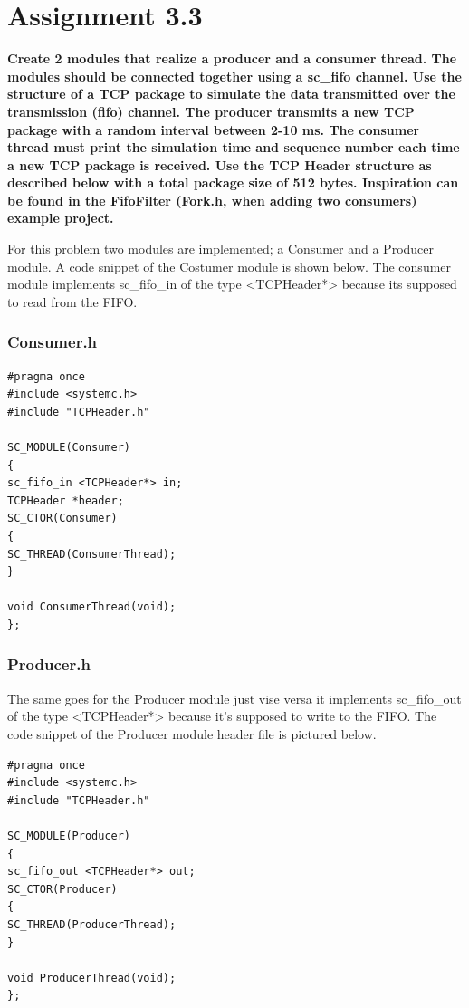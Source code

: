 
\chapter{Assignment 3.3}

\textbf{Create 2 modules that realize a producer and a consumer thread. The modules should be
	connected together using a sc\_fifo channel. Use the structure of a TCP package to simulate the
	data transmitted over the transmission (fifo) channel. The producer transmits a new TCP package
	with a random interval between 2-10 ms. The consumer thread must print the simulation time and
	sequence number each time a new TCP package is received. Use the TCP Header structure as
	described below with a total package size of 512 bytes. Inspiration can be found in the FifoFilter
	(Fork.h, when adding two consumers) example project.
}

For this problem two modules are implemented; a Consumer and a Producer module. 
A code snippet of the Costumer module is shown below. 
The consumer module implements sc\_fifo\_in of the type <TCPHeader*> because its supposed to read from the FIFO.

\subsection{Consumer.h}
\begin{lstlisting}
#pragma once
#include <systemc.h>
#include "TCPHeader.h"

SC_MODULE(Consumer)
{
sc_fifo_in <TCPHeader*> in;
TCPHeader *header;
SC_CTOR(Consumer)
{
SC_THREAD(ConsumerThread);
}

void ConsumerThread(void);
};
\end{lstlisting}


\subsection{Producer.h}
The same goes for the Producer module just vise versa it implements sc\_fifo\_out of the type <TCPHeader*> because it’s supposed to write to the FIFO. The code snippet of the Producer module header file is pictured below.
\begin{lstlisting}
#pragma once
#include <systemc.h>
#include "TCPHeader.h"

SC_MODULE(Producer)
{
sc_fifo_out <TCPHeader*> out;
SC_CTOR(Producer)
{
SC_THREAD(ProducerThread);
}

void ProducerThread(void);
};
\end{lstlisting}





